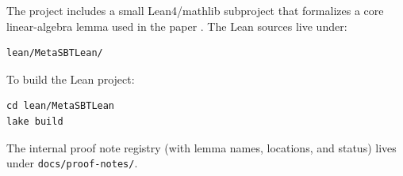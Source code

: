 \documentclass[11pt]{article}
\theoremstyle{plain}
\theoremstyle{definition}
\theoremstyle{remark}
\begin{document}
The project includes a small Lean4/mathlib subproject that formalizes a core linear-algebra lemma used in the paper \cite{moura2015lean,mathlib2020}.
The Lean sources live under:

\begin{verbatim}
lean/MetaSBTLean/
\end{verbatim}

To build the Lean project:

\begin{verbatim}
cd lean/MetaSBTLean
lake build
\end{verbatim}

\noindent
The internal proof note registry (with lemma names, locations, and status) lives under \texttt{docs/\allowbreak proof-notes/}.
 
\clearpage


\end{document}
